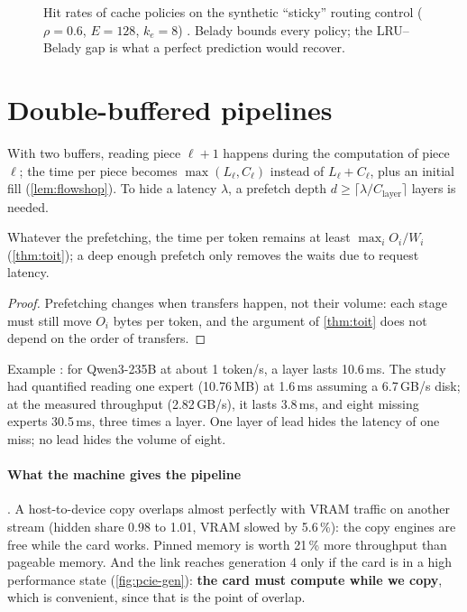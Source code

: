 \begin{figure}[ht]
\centering
\GrapheLocalite
\caption[Cache policy hit rates on synthetic routing]{Hit rates of cache policies on the synthetic \enquote{sticky} routing control ($\rho = 0.6$, $E = 128$, $k_e = 8$) \calc. Belady bounds every policy; the LRU--Belady gap is what a perfect prediction would recover.}
\label{fig:localite}
\end{figure}

\section{Double-buffered pipelines}\label{sec:double-tampon}

With two buffers, reading piece $\ell+1$ happens during the computation of piece $\ell$; the time per piece becomes $\max(L_\ell, C_\ell)$ instead of $L_\ell + C_\ell$, plus an initial fill (\cref{lem:flowshop}). To hide a latency $\lambda$, a prefetch depth $d \ge \lceil \lambda / C_{\text{layer}} \rceil$ layers is needed.

\begin{proposition}\label{prop:volume}
Whatever the prefetching, the time per token remains at least $\max_i O_i/W_i$ (\cref{thm:toit}); a deep enough prefetch only removes the waits due to request latency.
\end{proposition}

\begin{proof}
Prefetching changes when transfers happen, not their volume: each stage must still move $O_i$ bytes per token, and the argument of \cref{thm:toit} does not depend on the order of transfers.
\end{proof}

Example \calc: for Qwen3-235B at about 1 token/s, a layer lasts 10.6\,ms. The study had quantified reading one expert (10.76\,MB) at 1.6\,ms assuming a 6.7\,GB/s disk; at the measured throughput (2.82\,GB/s), it lasts 3.8\,ms, and eight missing experts 30.5\,ms, three times a layer. One layer of lead hides the latency of one miss; no lead hides the volume of eight.

\paragraph{What the machine gives the pipeline} \mes. A host-to-device copy overlaps almost perfectly with VRAM traffic on another stream (hidden share 0.98 to 1.01, VRAM slowed by 5.6\,\%): the copy engines are free while the card works. Pinned memory is worth 21\,\% more throughput than pageable memory. And the link reaches generation 4 only if the card is in a high performance state (\cref{fig:pcie-gen}): \textbf{the card must compute while we copy}, which is convenient, since that is the point of overlap.

